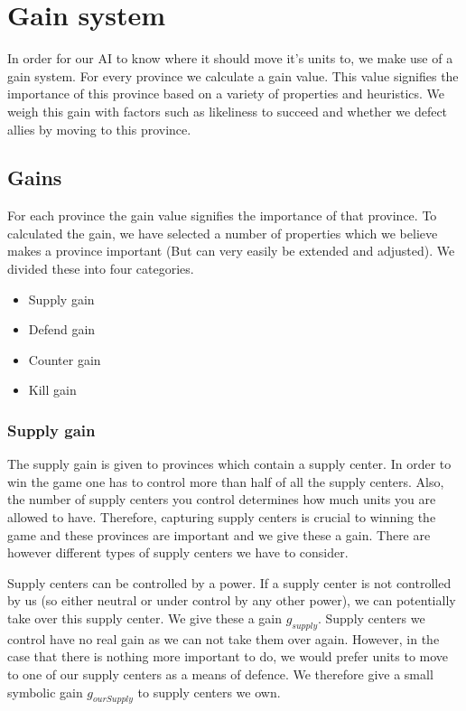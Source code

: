 \documentclass[a4paper]{article} %
\begin{document}
\section{Gain system}


In order for our AI to know where it should move it's units to, we make use of a gain system. For every province we calculate a gain value. This value signifies the importance of this province based on a variety of properties and heuristics. We weigh this gain with factors such as likeliness to succeed and whether we defect allies by moving to this province. 

\subsection{Gains}  

For each province the gain value signifies the importance of that province. To calculated the gain, we have selected a number of properties which we believe makes a province important (But can very easily be extended and adjusted). We divided these into four categories. 

\begin{itemize}
\item Supply gain
\item Defend gain
\item Counter gain
\item Kill gain
\end{itemize}

\subsubsection{Supply gain}
\label{sec:supplygain}
The supply gain is given to provinces which contain a supply center. In order to win the game one has to control more than half of all the supply centers. Also, the number of supply centers you control determines how much units you are allowed to have. Therefore, capturing supply centers is crucial to winning the game and these provinces are important and we give these a gain. There are however different types of supply centers we have to consider. 

Supply centers can be controlled by a power. If a supply center is not controlled by us (so either neutral or under control by any other power), we can potentially take over this supply center. We give these a gain $g_{supply}$. Supply centers we control have no real gain as we can not take them over again. However, in the case that there is nothing more important to do, we would prefer units to move to one of our supply centers as a means of defence. We therefore give a small symbolic gain $g_{ourSupply}$ to supply centers we own. 
\end{document}
